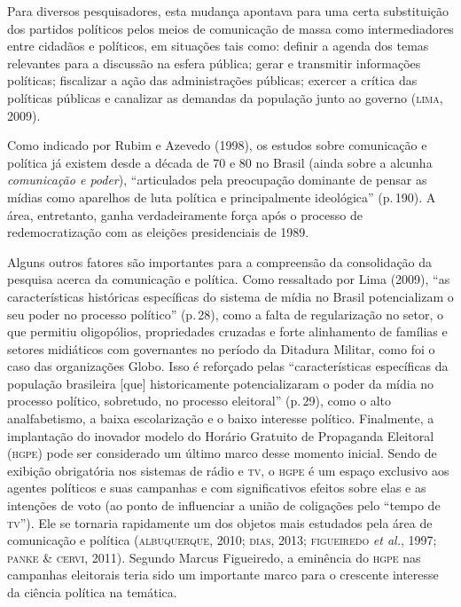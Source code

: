 {Para diversos pesquisadores, esta mudança apontava para uma certa
substituição dos partidos políticos pelos meios de comunicação de massa
como intermediadores entre cidadãos e políticos, em situações tais como:
definir a agenda dos temas relevantes para a discussão na esfera
pública; gerar e transmitir informações políticas; fiscalizar a
ação das administrações públicas; exercer a crítica das políticas
públicas e canalizar as demandas da população junto ao governo (\textsc{lima},
2009).

Como indicado por Rubim e Azevedo (1998), os estudos sobre comunicação e
política já existem desde a década de 70 e 80 no Brasil (ainda sobre a
alcunha \textit{comunicação e poder}), ``articulados pela preocupação
dominante de pensar as mídias como aparelhos de luta política e
principalmente ideológica'' (p.\,190). A área, entretanto, ganha
verdadeiramente força após o processo de redemocratização com as
eleições presidenciais de 1989.

Alguns outros fatores são importantes para a compreensão da consolidação
da pesquisa acerca da comunicação e política. Como ressaltado por Lima
(2009), ``as características históricas específicas do sistema de mídia
no Brasil potencializam o seu poder no processo político'' (p.\,28), como
a falta de regularização no setor, o que permitiu oligopólios,
propriedades cruzadas e forte alinhamento de famílias e setores
midiáticos com governantes no período da Ditadura Militar, como foi o
caso das organizações Globo. Isso é reforçado pelas ``características
específicas da população brasileira {[}que{]} historicamente
potencializaram o poder da mídia no processo político, sobretudo, no
processo eleitoral'' (p.\,29), como o alto analfabetismo, a baixa
escolarização e o baixo interesse político. Finalmente, a implantação do
inovador modelo do Horário Gratuito de Propaganda Eleitoral (\textsc{hgpe}) pode
ser considerado um último marco desse momento inicial. Sendo de exibição
obrigatória nos sistemas de rádio e \textsc{tv}, o \textsc{hgpe} é um espaço exclusivo aos
agentes políticos e suas campanhas e com significativos efeitos sobre
elas e as intenções de voto (ao ponto de influenciar a união de
coligações pelo ``tempo de \textsc{tv}''). Ele se tornaria rapidamente um dos
objetos mais estudados pela área de comunicação e política (\textsc{albuquerque},
2010; \textsc{dias}, 2013; \textsc{figueiredo} \textit{et al.}, 1997; \textsc{panke \& cervi}, 2011).
Segundo Marcus Figueiredo, a eminência do \textsc{hgpe} nas campanhas eleitorais
teria sido um importante marco para o crescente interesse da ciência
política na temática.

}
